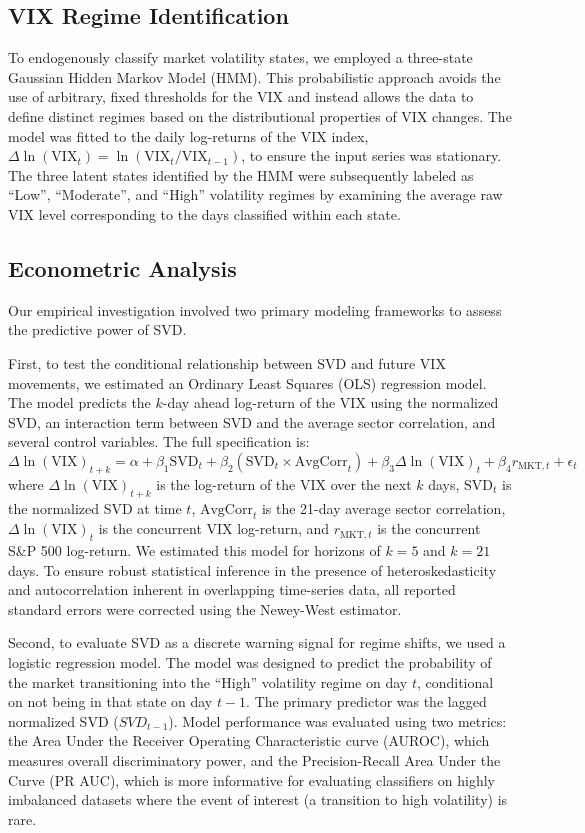 \documentclass[]{article}
\begin{document}
\subsection{VIX Regime Identification}
To endogenously classify market volatility states, we employed a three-state Gaussian Hidden Markov Model (HMM). This probabilistic approach avoids the use of arbitrary, fixed thresholds for the VIX and instead allows the data to define distinct regimes based on the distributional properties of VIX changes. The model was fitted to the daily log-returns of the VIX index, $\Delta \ln(\text{VIX}_t) = \ln(\text{VIX}_t / \text{VIX}_{t-1})$, to ensure the input series was stationary. The three latent states identified by the HMM were subsequently labeled as ``Low'', ``Moderate'', and ``High'' volatility regimes by examining the average raw VIX level corresponding to the days classified within each state.

\subsection{Econometric Analysis}
Our empirical investigation involved two primary modeling frameworks to assess the predictive power of SVD.

First, to test the conditional relationship between SVD and future VIX movements, we estimated an Ordinary Least Squares (OLS) regression model. The model predicts the $k$-day ahead log-return of the VIX using the normalized SVD, an interaction term between SVD and the average sector correlation, and several control variables. The full specification is:
\begin{equation}
    \Delta \ln(\text{VIX})_{t+k} = \alpha + \beta_1 \text{SVD}_t + \beta_2 (\text{SVD}_t \times \text{AvgCorr}_t) + \beta_3 \Delta \ln(\text{VIX})_t + \beta_4 r_{\text{MKT},t} + \epsilon_t
\end{equation}
where $\Delta \ln(\text{VIX})_{t+k}$ is the log-return of the VIX over the next $k$ days, $\text{SVD}_t$ is the normalized SVD at time $t$, $\text{AvgCorr}_t$ is the 21-day average sector correlation, $\Delta \ln(\text{VIX})_t$ is the concurrent VIX log-return, and $r_{\text{MKT},t}$ is the concurrent S\&P 500 log-return. We estimated this model for horizons of $k=5$ and $k=21$ days. To ensure robust statistical inference in the presence of heteroskedasticity and autocorrelation inherent in overlapping time-series data, all reported standard errors were corrected using the Newey-West estimator.

Second, to evaluate SVD as a discrete warning signal for regime shifts, we used a logistic regression model. The model was designed to predict the probability of the market transitioning into the ``High'' volatility regime on day $t$, conditional on not being in that state on day $t-1$. The primary predictor was the lagged normalized SVD ($SVD_{t-1}$). Model performance was evaluated using two metrics: the Area Under the Receiver Operating Characteristic curve (AUROC), which measures overall discriminatory power, and the Precision-Recall Area Under the Curve (PR AUC), which is more informative for evaluating classifiers on highly imbalanced datasets where the event of interest (a transition to high volatility) is rare.
\end{document}
